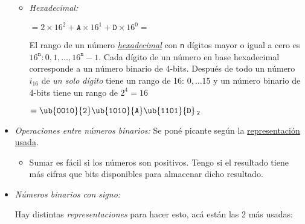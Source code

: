 \begin{itemize}[label=\iconTeoriaUno]
\begin{itemize}[label=\iconTeoriaDos]
          \item \textit{Hexadecimal:}
                \begin{center}
                   $= 2 \times 16^2 + \texttt{A} \times 16^1 + \texttt{D} \times 16^0 =$ 
                \end{center}
                El rango de un número \underline{\textit{hexadecimal}} con \texttt{n} dígitos mayor o igual a cero es $16^{\texttt{n}}: 0,1, \dots, 16^{\texttt{n}} - 1$.
                Cada dígito de un número en base hexadecimal corresponde a un número binario
                de 4-bits. Después de todo un número $i_{16}$ de \textit{un solo dígito} tiene un
                rango de 16: $0,\dots 15$ y
                un número binario de 4-bits tiene un rango de $2^4 = 16$ \checkmark

                \begin{center}
                   $= \ub{\texttt{0010}}{\texttt{2}} \ub{\texttt{1010}}{\texttt{A}}\ub{\texttt{1101}}{\texttt{D}}\,_{\texttt{2}}$
                \end{center}

        \end{itemize}

  \item \textit{Operaciones entre números binarios:} Se poné picante según la \underline{representación usada}.
        \begin{itemize}[label=\iconTeoriaDos]
          \item Sumar es fácil si los números son positivos. Tengo \overflow si el resultado
                tiene más cifras que bits disponibles para almacenar dicho resultado.
        \end{itemize}

  \item \textit{Números binarios con signo: }\par
        Hay distintas \textit{representaciones} para hacer esto, acá están las 2 más usadas:
        \begin{itemize}[label=\iconTeoriaDos]


\end{itemize}
\end{itemize}
